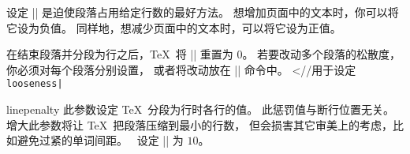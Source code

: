设定 |\looseness| 是迫使段落占用给定行数的最好方法。
想增加页面中的文本时，你可以将它设为负值。
同样地，想减少页面中的文本时，可以将它设为正值。

在结束段落并分段为行之后，\TeX\ 将 |\looseness| 重置为 $0$。
若要改动多个段落的松散度，你必须对每个段落分别设置，
或者将改动放在 |\everypar|
\ctsref\everypar 命令中。
^^|\everypar//用于设定 \b\tt\\looseness\e|
\enddesc

\begindesc
\cts linepenalty {}
\explain
{}
此参数设定 \TeX\ 分段为行时各行的值。
此惩罚值与断行位置无关。
增大此参数将让  \TeX\ 把段落压缩到最小的行数，
但会损害其它审美上的考虑，比如避免过紧的单词间距。
\PlainTeX\ 设定 |\linepenalty| 为 $10$。
\enddesc

